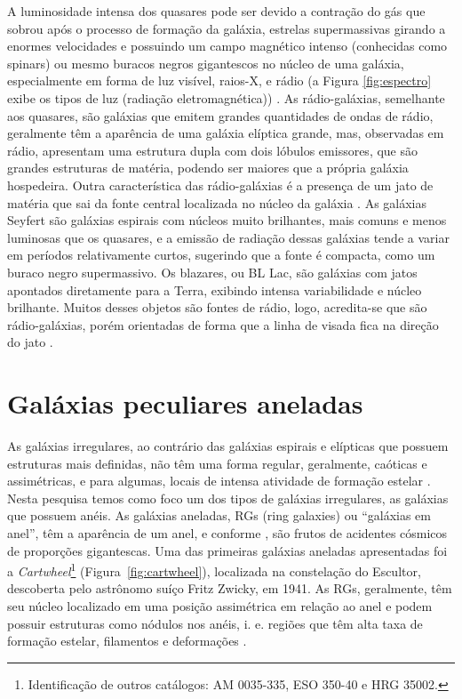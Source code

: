 A luminosidade intensa dos quasares pode ser devido a  contração do gás que sobrou após o processo de formação da galáxia, estrelas supermassivas girando a enormes velocidades e possuindo um campo magnético intenso (conhecidas como spinars) ou mesmo buracos negros gigantescos no núcleo de uma galáxia, especialmente em forma de luz visível, raios-X, e rádio (a Figura \ref{fig:espectro} exibe os tipos de luz (radiação eletromagnética)) \cite{2003Wuensche}. As rádio-galáxias, semelhante aos quasares, são galáxias que emitem grandes quantidades de ondas de rádio, geralmente têm a aparência de uma galáxia elíptica grande, mas, observadas em rádio, apresentam uma estrutura dupla com dois lóbulos emissores, que são grandes estruturas de matéria, podendo ser maiores que a própria galáxia hospedeira. Outra característica das rádio-galáxias é a presença de um jato de matéria que sai da fonte central localizada no núcleo da galáxia \cite{2003Wuensche,2010arnab}. As galáxias Seyfert são galáxias espirais com núcleos muito brilhantes, mais comuns e menos luminosas que os quasares, e a emissão de radiação dessas galáxias tende a variar em períodos relativamente curtos, sugerindo que a fonte é compacta, como um buraco negro supermassivo. Os blazares, ou BL Lac, são galáxias com jatos apontados diretamente para a Terra, exibindo intensa variabilidade e núcleo brilhante. Muitos desses objetos são fontes de rádio, logo, acredita-se que são rádio-galáxias, porém orientadas de forma que a linha de visada fica na direção do jato \cite{2022gastao}. 

\section{Galáxias peculiares aneladas}

As galáxias irregulares, ao contrário das galáxias espirais e elípticas que possuem estruturas mais definidas, não têm uma forma regular, geralmente, caóticas e assimétricas, e para algumas, locais de intensa atividade de formação estelar \cite{2023Muller}. Nesta pesquisa temos como foco um dos tipos de galáxias irregulares, as galáxias que possuem anéis. As galáxias aneladas, RGs (ring galaxies) ou ``galáxias em anel'', têm a aparência de um anel, e conforme , são frutos de acidentes cósmicos de proporções gigantescas. Uma das primeiras galáxias aneladas apresentadas foi a \emph{Cartwheel}\footnote{Identificação de outros catálogos: AM 0035-335, ESO 350-40 e HRG 35002.} (Figura~\ref{fig:cartwheel}), localizada na constelação do Escultor, descoberta pelo astrônomo suíço Fritz Zwicky, em 1941. As RGs, geralmente, têm seu núcleo localizado em uma posição assimétrica em relação ao anel e podem possuir estruturas como nódulos nos anéis, i. e. regiões que têm alta taxa de formação estelar, filamentos e deformações \cite{2016lago}. 

